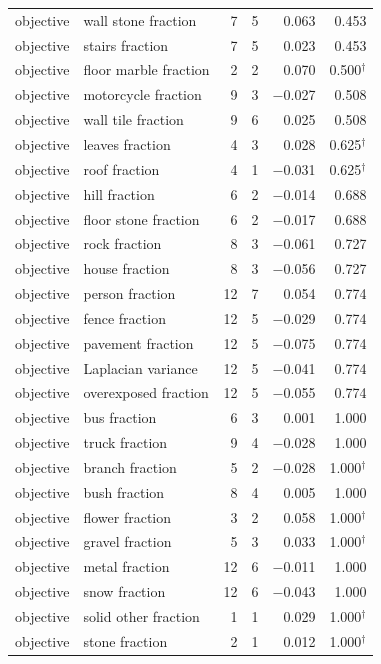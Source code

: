 \documentclass[11pt,a4paper]{article}
\begin{document}
\begin{longtable}{llrrrr}
objective & wall stone fraction & 7 & 5 & 0.063 & 0.453 \\
objective & stairs fraction & 7 & 5 & 0.023 & 0.453 \\
objective & floor marble fraction & 2 & 2 & 0.070 & 0.500$^{\dagger}$ \\
objective & motorcycle fraction & 9 & 3 & $-$0.027 & 0.508 \\
objective & wall tile fraction & 9 & 6 & 0.025 & 0.508 \\
objective & leaves fraction & 4 & 3 & 0.028 & 0.625$^{\dagger}$ \\
objective & roof fraction & 4 & 1 & $-$0.031 & 0.625$^{\dagger}$ \\
objective & hill fraction & 6 & 2 & $-$0.014 & 0.688 \\
objective & floor stone fraction & 6 & 2 & $-$0.017 & 0.688 \\
objective & rock fraction & 8 & 3 & $-$0.061 & 0.727 \\
objective & house fraction & 8 & 3 & $-$0.056 & 0.727 \\
objective & person fraction & 12 & 7 & 0.054 & 0.774 \\
objective & fence fraction & 12 & 5 & $-$0.029 & 0.774 \\
objective & pavement fraction & 12 & 5 & $-$0.075 & 0.774 \\
objective & Laplacian variance & 12 & 5 & $-$0.041 & 0.774 \\
objective & overexposed fraction & 12 & 5 & $-$0.055 & 0.774 \\
objective & bus fraction & 6 & 3 & 0.001 & 1.000 \\
objective & truck fraction & 9 & 4 & $-$0.028 & 1.000 \\
objective & branch fraction & 5 & 2 & $-$0.028 & 1.000$^{\dagger}$ \\
objective & bush fraction & 8 & 4 & 0.005 & 1.000 \\
objective & flower fraction & 3 & 2 & 0.058 & 1.000$^{\dagger}$ \\
objective & gravel fraction & 5 & 3 & 0.033 & 1.000$^{\dagger}$ \\
objective & metal fraction & 12 & 6 & $-$0.011 & 1.000 \\
objective & snow fraction & 12 & 6 & $-$0.043 & 1.000 \\
objective & solid other fraction & 1 & 1 & 0.029 & 1.000$^{\dagger}$ \\
objective & stone fraction & 2 & 1 & 0.012 & 1.000$^{\dagger}$ \\

\end{longtable}
\end{document}
